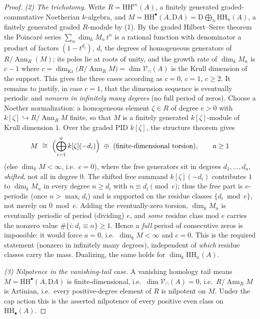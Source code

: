\documentclass[11pt]{amsart}
\theoremstyle{definition}
\newcommand{\HH}{\mathrm{HH}}
\newcommand{\D}{\mathrm{D}}
\newcommand{\Vcap}{\mathcal{V}_{\cap}}
\newcommand{\kk}{k}
\newcommand{\ev}{\mathrm{ev}}
\begin{document}
\begin{proof}
\emph{(2) The trichotomy.} Write $R=\HH^{\ev}(A)$, a finitely generated
graded-commutative Noetherian $\kk$-algebra, and $M=\HH^\bullet(A,\D A)
=\D\bigoplus_n\HH_n(A)$, a finitely generated graded $R$-module by (1). By the
graded Hilbert--Serre theorem the Poincar\'e series $\sum_n\dim_\kk M_n\,t^n$ is
a rational function with denominator a product of factors $(1-t^{d_i})$, $d_i$
the degrees of homogeneous generators of $R/\operatorname{Ann}_R(M)$; its poles
lie at roots of unity, and the growth rate of $\dim_\kk M_n$ is $c-1$ where
$c=\dim_{\mathrm{Kr}}\bigl(R/\operatorname{Ann}_R M\bigr)=\dim\Vcap(A)$ is the
Krull dimension of the support. This gives the three cases according as $c=0$,
$c=1$, $c\ge2$. It remains to justify, in case $c=1$, that the dimension
sequence is eventually periodic and \emph{nonzero in infinitely many degrees}
(no full period of zeros). Choose a Noether normalization: a homogeneous
element $\zeta\in R$ of degree $e>0$ with
$\kk[\zeta]\hookrightarrow R/\operatorname{Ann}_R M$ finite, so that $M$ is a
finitely generated $\kk[\zeta]$-module of Krull dimension $1$. Over the graded
PID $\kk[\zeta]$, the structure theorem gives
\[
M\ \cong\ \Bigl(\bigoplus_{i=1}^{a}\kk[\zeta](-d_i)\Bigr)\ \oplus\
(\text{finite-dimensional torsion}),\qquad a\ge1
\]
(else $\dim_\kk M<\infty$, i.e.\ $c=0$), where the free generators sit in
degrees $d_1,\dots,d_a$, \emph{shifted}, not all in degree $0$. The shifted
free summand $\kk[\zeta](-d_i)$ contributes $1$ to $\dim_\kk M_n$ in every
degree $n\ge d_i$ with $n\equiv d_i\pmod e$; thus the free part is
$e$-periodic (once $n>\max_i d_i$) and is supported on the residue classes
$\{d_i\bmod e\}$, not merely on $0\bmod e$. Adding the eventually-zero torsion,
$\dim_\kk M_n$ is eventually periodic of period (dividing) $e$, and \emph{some}
residue class mod $e$ carries the nonzero value $\#\{i:d_i\equiv n\}\ge1$.
Hence a \emph{full} period of consecutive zeros is impossible: it would
force $a=0$, i.e.\ $\dim_\kk M<\infty$ and $c=0$. This is the required
statement (nonzero in infinitely many degrees), independent of \emph{which}
residue classes carry the mass. Dualizing, the same holds for
$\dim_\kk\HH_n(A)$.

\emph{(3) Nilpotence in the vanishing-tail case.} A vanishing homology tail
means $M=\HH^\bullet(A,\D A)$ is finite-dimensional, i.e.\ $\dim\Vcap(A)=0$,
i.e.\ $R/\operatorname{Ann}_R M$ is Artinian, i.e.\ every positive-degree
element of $R$ is nilpotent on $M$. Under the cap action this is the asserted
nilpotence of every positive even class on $\HH_\bullet(A)$.
\end{proof}
\end{document}
